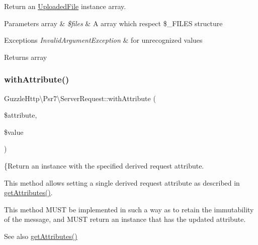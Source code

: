 Return an \hyperlink{classGuzzleHttp_1_1Psr7_1_1UploadedFile}{Uploaded\+File} instance array.


\begin{DoxyParams}[1]{Parameters}
array & {\em \$files} & A array which respect \$\+\_\+\+F\+I\+L\+ES structure \\
\hline
\end{DoxyParams}

\begin{DoxyExceptions}{Exceptions}
{\em Invalid\+Argument\+Exception} & for unrecognized values \\
\hline
\end{DoxyExceptions}
\begin{DoxyReturn}{Returns}
array 
\end{DoxyReturn}
\mbox{\label{classGuzzleHttp_1_1Psr7_1_1ServerRequest_a64a08accffbb9355e68df2bb1af4a654}} 
\subsubsection{\texorpdfstring{with\+Attribute()}{withAttribute()}}
{\footnotesize\ttfamily Guzzle\+Http\textbackslash{}\+Psr7\textbackslash{}\+Server\+Request\+::with\+Attribute (\begin{DoxyParamCaption}\item[{}]{\$attribute,  }\item[{}]{\$value }\end{DoxyParamCaption})}

\{Return an instance with the specified derived request attribute.

This method allows setting a single derived request attribute as described in \hyperlink{interfacePsr_1_1Http_1_1Message_1_1ServerRequestInterface_a0cda25a9b297c86e7813ffcb98ceb3df}{get\+Attributes()}.

This method M\+U\+ST be implemented in such a way as to retain the immutability of the message, and M\+U\+ST return an instance that has the updated attribute.

\begin{DoxySeeAlso}{See also}
\hyperlink{interfacePsr_1_1Http_1_1Message_1_1ServerRequestInterface_a0cda25a9b297c86e7813ffcb98ceb3df}{get\+Attributes()} 
\end{DoxySeeAlso}

